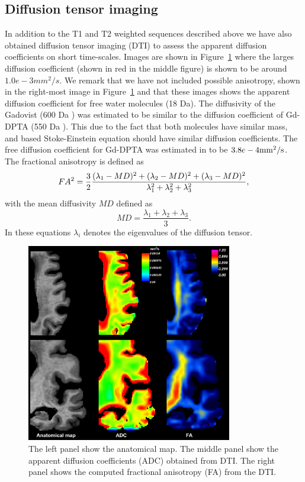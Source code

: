 \documentclass[11pt,a4paper]{article}
\begin{document}
\subsection{Diffusion tensor imaging}
In addition to the T1 and T2 weighted sequences described above we have also obtained diffusion tensor imaging (DTI) to assess the apparent diffusion 
coefficients on short time-scales. Images are shown in Figure~\ref{figuredti} where the larges diffusion coefficient (shown in 
red in the middle figure) is shown to be around $1.0e-3 mm^2/s$. We remark that we have not included possible anisotropy, shown in 
the right-most image in Figure~\ref{figuredti} and that these images shows the apparent diffusion coefficient for free water molecules (18 Da).      
The diffusivity of the Gadovist (600 Da \cite{MGadobutrol}) was estimated to be similar to the diffusion coefficient of Gd-DPTA (550 Da \cite{MGgDPTA}). This due to the fact that both molecules have similar mass, and based Stoke-Einstein equation should have similar diffusion coefficients. The free diffusion coefficient for Gd-DPTA was estimated in \cite{GdDPTA-DIFFUSION} to be $3.8e-4\mathrm{mm\sp{2}/s}$.
The fractional anisotropy is defined as 
\begin{equation}
FA\sp{2} =  \frac{3}{2} \frac{ (\lambda_1 - MD )\sp{2} +(\lambda_2 - MD )\sp{2} +(\lambda_3 - MD )\sp{2}}{\lambda\sp{2}_1 + \lambda\sp{2}_2  +\lambda\sp{2}_3 },
\end{equation}
with the mean diffusivity $MD$ defined as 
\begin{equation}
MD = \frac{\lambda_1 +\lambda_2 +\lambda_3 }{3}.
\end{equation}
In these equations $\lambda_i$ denotes the eigenvalues of the diffusion tensor.
\begin{figure}
\centering
\includegraphics[width=0.80\textwidth]{DTI-zoom.png} 
\caption{The left panel show the anatomical map. The middle panel show the apparent diffusion coefficients (ADC) obtained from DTI. The right panel shows the computed fractional anisotropy (FA) from the DTI.}
\label{figuredti} 
\end{figure}
\end{document}
